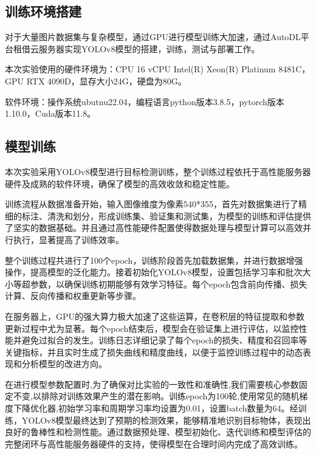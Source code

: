 \documentclass[journal]{IEEEtran}
\numberwithin{figure}{section}%
\begin{document}
\subsection{训练环境搭建}
对于大量图片数据集与复杂模型，通过GPU进行模型训练大加速，通过AutoDL平台租借云服务器实现YOLOv8模型的搭建，训练，测试与部署工作。\par
本次实验使用的硬件环境为：CPU 16 vCPU Intel(R) Xeon(R) Platinum 8481C，GPU RTX 4090D，显存大小24G，硬盘为80G。\par
软件环境：操作系统ubutnu22.04，编程语言python版本3.8.5，pytorch版本1.10.0，Cuda版本11.8。\par

\subsection{模型训练}
本次实验采用YOLOv8模型进行目标检测训练，整个训练过程依托于高性能服务器硬件及成熟的软件环境，确保了模型的高效收敛和稳定性能。\par
训练流程从数据准备开始，输入图像维度为像素540*355，首先对数据集进行了精细的标注、清洗和划分，形成训练集、验证集和测试集，为模型的训练和评估提供了坚实的数据基础。并且通过高性能硬件配置使得数据处理与模型计算可以高效并行执行，显著提高了训练效率。\par
整个训练过程共进行了100个epoch，训练阶段首先加载数据集，并进行数据增强操作，提高模型的泛化能力。接着初始化YOLOv8模型，设置包括学习率和批次大小等超参数，以确保训练初期能够有效学习特征。每个epoch包含前向传播、损失计算、反向传播和权重更新等步骤。\par
在服务器上，GPU的强大算力极大加速了这些运算，在卷积层的特征提取和参数更新过程中尤为显著。每个epoch结束后，模型会在验证集上进行评估，以监控性能并避免过拟合的发生。训练日志详细记录了每个epoch的损失、精度和召回率等关键指标，并且实时生成了损失曲线和精度曲线，以便于监控训练过程中的动态表现和分析模型的改进方向。\par
在进行模型参数配置时,为了确保对比实验的一致性和准确性,我们需要核心参数固定不变,以排除对训练效果产生的潜在影响。训练epoch为100轮,使用常见的随机梯度下降优化器,初始学习率和周期学习率均设置为0.01，设置batch数量为64。经训练，YOLOv8模型最终达到了预期的检测效果，能够精准地识别目标物体，表现出良好的鲁棒性和检测性能。通过数据预处理、模型初始化、迭代训练和模型评估的完整闭环与高性能服务器硬件的支持，使得模型在合理时间内完成了高效训练。\par

\end{document}
